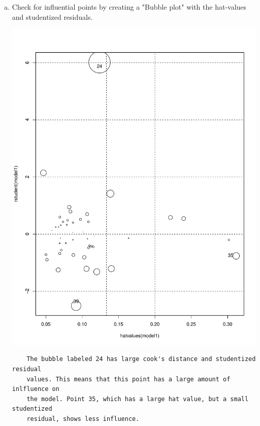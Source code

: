 \documentclass[12pt,letterpaper]{article}
\begin{document}
\begin{enumerate}[(a)]
	\item Check for influential points by creating a "Bubble plot" with the hat-values and studentized residuals.
	
	\includegraphics[width=.75\textwidth]{bubbleplot.pdf}
	\begin{verbatim}
	The bubble labeled 24 has large cook's distance and studentized residual
	values. This means that this point has a large amount of inlfluence on
	the model. Point 35, which has a large hat value, but a small studentized
	residual, shows less influence.
	\end{verbatim}
\end{enumerate}
\end{document}
